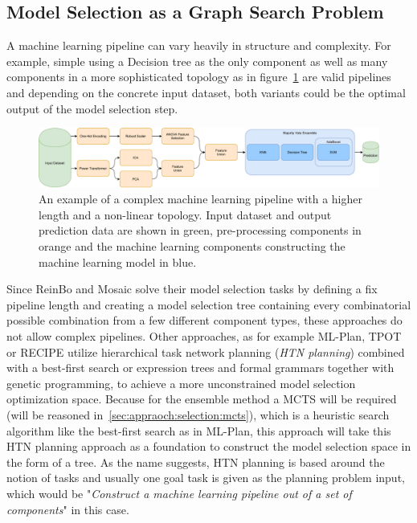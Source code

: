 \subsection{Model Selection as a Graph Search Problem}
\label{sec:appraoch:selection:search}
A machine learning pipeline can vary heavily in structure and complexity.
For example, simple using a Decision tree as the only component as well as many components in a more sophisticated topology as in figure~\ref{fig:appraoch:complex-pipeline} are valid pipelines and depending on the concrete input dataset, both variants could be the optimal output of the model selection step.
\begin{figure}[ht!]
    \centering
    \includegraphics[width=\textwidth]{gfx/Figures/Approach/ComplexPipeline.pdf}
    \caption{An example of a complex machine learning pipeline with a higher length and a non-linear topology. Input dataset and output prediction data are shown in green, pre-processing components in orange and the machine learning components constructing the machine learning model in blue.}
    \label{fig:appraoch:complex-pipeline}
\end{figure}
Since ReinBo and Mosaic solve their model selection tasks by defining a fix pipeline length and creating a model selection tree containing every combinatorial possible combination from a few different component types, these approaches do not allow complex pipelines.\newline
Other approaches, as for example ML-Plan, TPOT or RECIPE utilize hierarchical task network planning (\textit{HTN planning}) combined with a best-first search or expression trees and formal grammars together with genetic programming, to achieve a more unconstrained model selection optimization space.
Because for the ensemble method a MCTS will be required (will be reasoned in~\ref{sec:appraoch:selection:mcts}), which is a heuristic search algorithm like the best-first search as in ML-Plan, this approach will take this HTN planning approach as a foundation to construct the model selection space in the form of a tree.\newline
As the name suggests, HTN planning is based around the notion of tasks and usually one goal task is given as the planning problem input, which would be "\textit{Construct a machine learning pipeline out of a set of components}" in this case.
